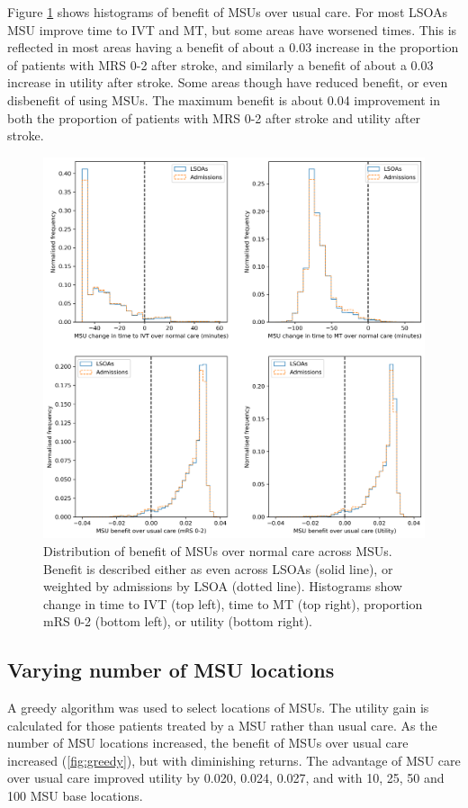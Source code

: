 Figure \ref{fig:msu_histograms} shows histograms of benefit of MSUs over usual care. For most LSOAs MSU improve time to IVT and MT, but some areas have worsened times. This is reflected in most areas having a benefit of about a 0.03 increase in the proportion of patients with MRS 0-2 after stroke, and similarly a benefit of about a 0.03 increase in utility after stroke. Some areas though have reduced benefit, or even disbenefit of using MSUs. The maximum benefit is about 0.04 improvement in both the proportion of patients with MRS 0-2 after stroke and utility after stroke.

\begin{figure}[h]
    \centering
    \includegraphics[width=0.75\linewidth]{images/histograms.png}
    \caption{Distribution of benefit of MSUs over normal care across MSUs. Benefit is described either as even across LSOAs (solid line), or weighted by admissions by LSOA (dotted line). Histograms show change in time to IVT (top left), time to MT (top right), proportion mRS 0-2 (bottom left), or utility (bottom right).}
    \label{fig:msu_histograms}
\end{figure}

\subsection{Varying number of MSU locations}

A greedy algorithm was used to select locations of MSUs. The utility gain is calculated for those patients treated by a MSU rather than usual care. As the number of MSU locations increased, the benefit of MSUs over usual care increased (\ref{fig:greedy}), but with diminishing returns. The advantage of MSU care over usual care improved utility by 0.020, 0.024, 0.027, and  with 10, 25, 50 and 100 MSU base locations. 

